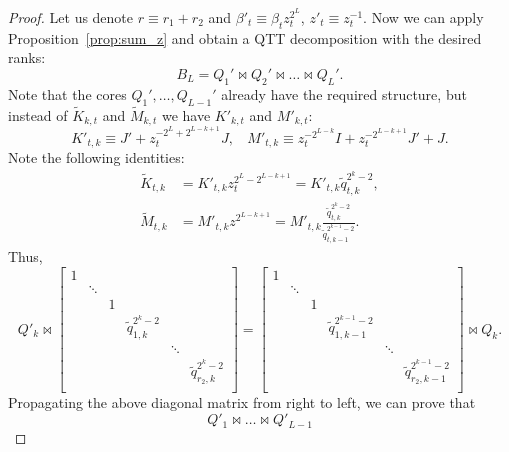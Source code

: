 \documentclass[a4paper]{article}
\newcommand{\LL}{L}
\newcommand{\KKother}{\widetilde{K}}
\newcommand{\MMother}{\widetilde{M}}
\newcommand{\bbeta}{\beta'}
\newcommand{\ww}{z'}
\newcommand{\qq}{\widetilde{q}}
\begin{document}
\begin{proof}
Let us denote $r \equiv r_1 + r_2$ and $\bbeta_t \equiv \beta_t z_t^{2^\LL}$, $\ww_t \equiv z_t^{-1}$.
Now we can apply Proposition~\ref{prop:sum_z} and obtain a QTT decomposition with the desired ranks:
\[
B_L = Q_1' \Join Q_2' \Join \dots \Join Q_L'.
\]
Note that the cores $Q_1', \dots, Q_{\LL-1}'$ already have the required structure, but instead of $\KKother_{k,t}$ and $\MMother_{k, t}$ we have $K'_{k,t}$ and $M'_{k,t}$:
\[
K'_{t,k} \equiv J' + z_t^{-2^\LL + 2^{\LL-k+1}}J,~~~~
M'_{t,k} \equiv z_t^{-2^{\LL-k}} I + z_t^{-2^{\LL-k+1}} J'  + J.
\]
Note the following identities: 
\begin{align*}
    \KKother_{t,k} &= K'_{t,k}z_t^{2^\LL - 2^{\LL-k+1}} = K'_{t,k}\qq_{t,k}^{2^k-2}, \\
    \MMother_{t,k} &= M'_{t,k}z^{2^{\LL-k+1}} = M'_{t,k}\frac{\qq_{t,k}^{2^k-2}}{\qq_{t,k-1}^{2^{k-1}-2}}.
\end{align*}
Thus,
\[
Q'_{k}
\Join
\begin{bmatrix}
    1 &        &   &                         &        & \\
      & \ddots &   &                         &        & \\
      &        & 1 &                         &        & \\
      &        &   & \qq_{1,k}^{2^k-2}               &        & \\
      &        &   &                         & \ddots & \\
      &        &   &                         &        & \qq_{r_2,k}^{2^k-2} \\
\end{bmatrix}
=
\begin{bmatrix}
    1 &        &   &                         &        & \\
      & \ddots &   &                         &        & \\
      &        & 1 &                         &        & \\
      &        &   & \qq_{1,k-1}^{2^{k-1}-2}             &        & \\
      &        &   &                         & \ddots & \\
      &        &   &                         &        & \qq_{r_2,k-1}^{2^{k-1}-2} \\
\end{bmatrix}
\Join
Q_k.
\]
Propagating the above diagonal matrix from right to left, we can prove that
\[
Q'_1\Join \dots \Join Q'_{\LL-1}
\]
\end{proof}
\end{document}
